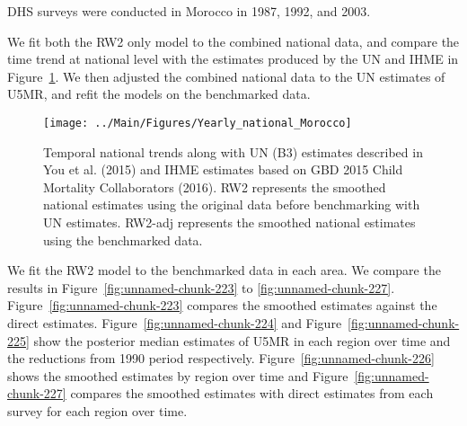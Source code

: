 \documentclass[12pt]{article}\usepackage[]{graphicx}\usepackage[]{color}
\newenvironment{knitrout}{}{} %
\begin{document}


DHS surveys were conducted in Morocco in 1987, 1992, and 2003.

We fit both the RW2 only model to the combined national data, and compare the time trend at national level with the estimates produced by the UN and IHME in Figure~\ref{fig:unnamed-chunk-222}. We then adjusted the combined national data to the UN estimates of U5MR, and refit the models on the benchmarked data. 

\begin{knitrout}
\color{fgcolor}\begin{figure}[bht]

{\centering \texttt{[image: ../Main/Figures/Yearly\_national\_Morocco]} 

}

\caption[Temporal national trends along with UN (B3) estimates described in You et al]{Temporal national trends along with UN (B3) estimates described in You et al. (2015) and IHME estimates based on GBD 2015 Child Mortality Collaborators (2016). RW2 represents the smoothed national estimates using the original data before benchmarking with UN estimates. RW2-adj represents the smoothed national estimates using the benchmarked data.}\label{fig:unnamed-chunk-222}
\end{figure}


\end{knitrout}
 

We fit the RW2 model to the benchmarked data in each area. 
We compare the results in Figure~\ref{fig:unnamed-chunk-223} to \ref{fig:unnamed-chunk-227}.
Figure~\ref{fig:unnamed-chunk-223} compares the smoothed estimates against the direct estimates. Figure~\ref{fig:unnamed-chunk-224} and Figure~\ref{fig:unnamed-chunk-225} show the posterior median estimates of U5MR in each region over time and the reductions from 1990 period respectively.
Figure~\ref{fig:unnamed-chunk-226} shows the smoothed estimates by region over time and Figure~\ref{fig:unnamed-chunk-227} compares the smoothed estimates with direct estimates from each survey for each region over time.


\end{document}
